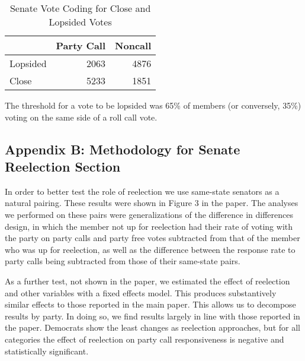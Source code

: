 \documentclass[12pt]{article}
\newcommand\fnote[1]{\captionsetup{font=small}\caption*{#1}}
\begin{document}
\begin{table}[H]
	\centering
	\singlespacing
	\caption{Senate Vote Coding for Close and Lopsided Votes} 
	\begin{tabular}{lrr}
		\hline
		& Party Call & Noncall \\ 
		\hline
		Lopsided & 2063 & 4876 \\ 
		Close & 5233 & 1851 \\ 
		\hline
	\end{tabular}
	\fnote{The threshold for a vote to be lopsided was 65\% of members (or conversely, 35\%) voting on the same side of a roll call vote.}
\end{table}













\subsection{Appendix B: Methodology for Senate Reelection Section}

In order to better test the role of reelection we use same-state senators as a natural pairing. These results were shown in Figure 3 in the paper. The analyses we performed on these pairs were generalizations of the difference in differences design, in which the member not up for reelection had their rate of voting with the party on party calls and party free votes subtracted from that of the member who was up for reelection, as well as the difference between the response rate to party calls being subtracted from those of their same-state pairs. 

As a further test, not shown in the paper, we estimated the effect of reelection and other variables with a fixed effects model. This produces substantively similar effects to those reported in the main paper. This allows us to decompose results by party. In doing so, we find results largely in line with those reported in the paper. Democrats show the least changes as reelection approaches, but for all categories the effect of reelection on party call responsiveness is negative and statistically significant.
\end{document}
